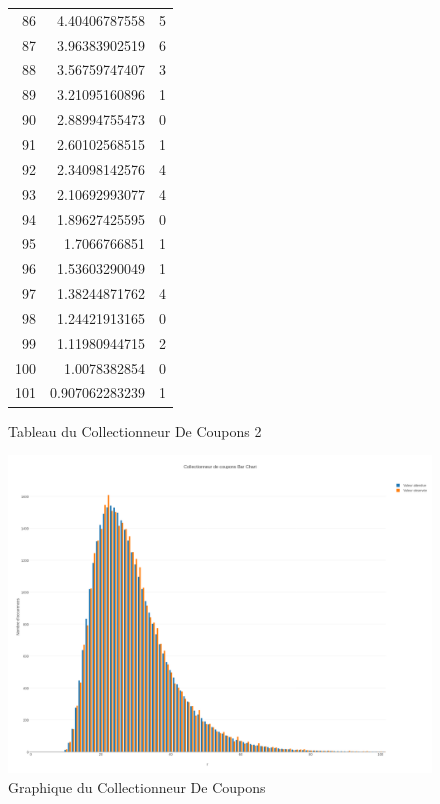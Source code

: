 \documentclass[10pt,a4paper]{article}
\begin{document}
\begin{figure}[h]
\begin{tabular}{|r|r|r|}
86 & 4.40406787558 & 5\\
87 & 3.96383902519 & 6\\
88 & 3.56759747407 & 3\\
89 & 3.21095160896 & 1\\
90 & 2.88994755473 & 0\\
91 & 2.60102568515 & 1\\
92 & 2.34098142576 & 4\\
93 & 2.10692993077 & 4\\
94 & 1.89627425595 & 0\\
95 & 1.7066766851 & 1\\
96 & 1.53603290049 & 1\\
97 & 1.38244871762 & 4\\
98 & 1.24421913165 & 0\\
99 & 1.11980944715 & 2\\
100 & 1.0078382854 & 0\\
101 & 0.907062283239 & 1\\
\hline
\end{tabular}
\caption{Tableau du Collectionneur De Coupons 2}
	\end{figure}

\newpage

\begin{figure}[h]
		\centering
\includegraphics[scale=0.25]{../chart_images/collectionneur_de_coupons_bar_chart.png}
\caption{Graphique du Collectionneur De Coupons}
	\end{figure}
\end{document}
